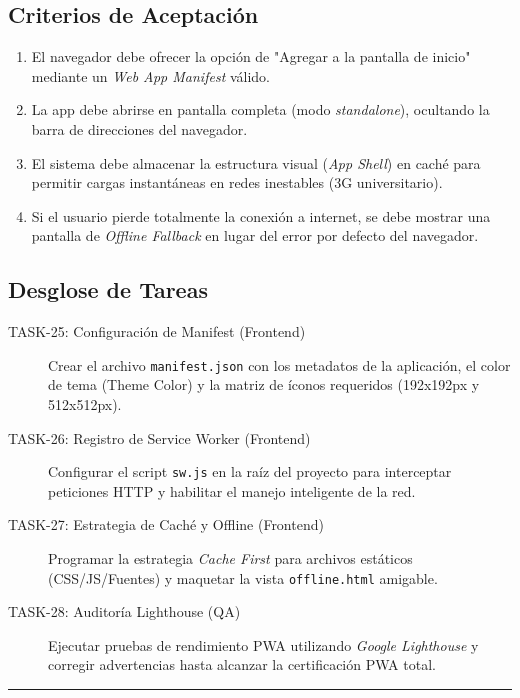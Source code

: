 \documentclass[11pt, letterpaper]{article}
\begin{document}
\begin{description}
    \subsection{Criterios de Aceptación}
    \begin{enumerate}[label=\bfseries\arabic*.]
        \item El navegador debe ofrecer la opción de "Agregar a la pantalla de inicio" mediante un \textit{Web App Manifest} válido.
        \item La app debe abrirse en pantalla completa (modo \textit{standalone}), ocultando la barra de direcciones del navegador.
        \item El sistema debe almacenar la estructura visual (\textit{App Shell}) en caché para permitir cargas instantáneas en redes inestables (3G universitario).
        \item Si el usuario pierde totalmente la conexión a internet, se debe mostrar una pantalla de \textit{Offline Fallback} en lugar del error por defecto del navegador.
    \end{enumerate}
   
    \subsection{Desglose de Tareas}
    \begin{description}
        \item[TASK-25: Configuración de Manifest (Frontend)] Crear el archivo \texttt{manifest.json} con los metadatos de la aplicación, el color de tema (Theme Color) y la matriz de íconos requeridos (192x192px y 512x512px).
        \item[TASK-26: Registro de Service Worker (Frontend)] Configurar el script \texttt{sw.js} en la raíz del proyecto para interceptar peticiones HTTP y habilitar el manejo inteligente de la red.
        \item[TASK-27: Estrategia de Caché y Offline (Frontend)] Programar la estrategia \textit{Cache First} para archivos estáticos (CSS/JS/Fuentes) y maquetar la vista \texttt{offline.html} amigable.
        \item[TASK-28: Auditoría Lighthouse (QA)] Ejecutar pruebas de rendimiento PWA utilizando \textit{Google Lighthouse} y corregir advertencias hasta alcanzar la certificación PWA total.
    \end{description}

    \vspace{1em}
    \hrule
    \vspace{2em}


\end{description}
\end{document}
